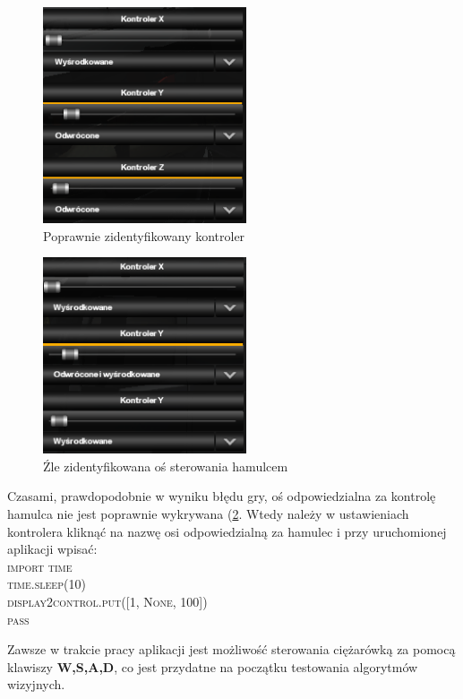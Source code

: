 \begin{figure}
  \centering
  \includegraphics[width=6cm]{img/appendix1_controller.png}
  \caption{Poprawnie zidentyfikowany kontroler}
  \label{fig:appendix1_controller}
\end{figure}

\begin{figure}
  \centering
  \includegraphics[width=6cm]{img/appendix1_bad_controller.png}
  \caption{Źle zidentyfikowana oś sterowania hamulcem}
  \label{fig:appendix1_bad_controller}
\end{figure}

Czasami, prawdopodobnie w wyniku błędu gry, oś odpowiedzialna za kontrolę hamulca nie jest poprawnie wykrywana (\ref{fig:appendix1_bad_controller}. 
Wtedy należy w ustawieniach kontrolera kliknąć na nazwę osi odpowiedzialną za hamulec i przy uruchomionej aplikacji wpisać:\\ \textsc{import time \\
time.sleep(10)\\
display2control.put([1, None, 100])\\
pass\\}

Zawsze w trakcie pracy aplikacji jest możliwość sterowania ciężarówką za pomocą klawiszy \textbf{W,S,A,D}, co jest przydatne na początku testowania algorytmów wizyjnych.

